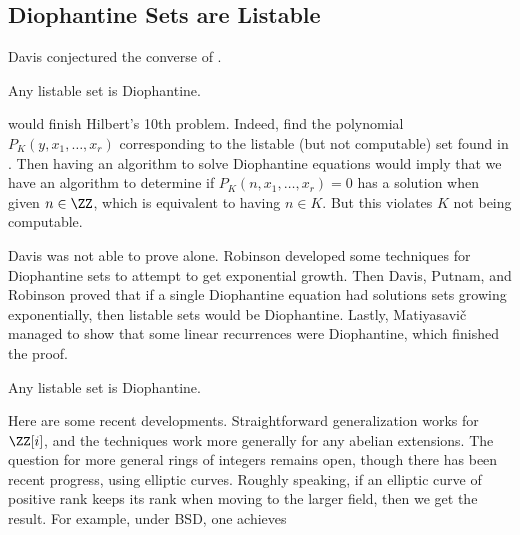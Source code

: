 \documentclass{article}
\begin{document}
\subsection{Diophantine Sets are Listable}
Davis conjectured the converse of .
\begin{conj}[Davis] \label{conj:davis}
	Any listable set is Diophantine.
\end{conj}
 would finish Hilbert's 10th problem. Indeed, find the polynomial $P_K(y,x_1,\ldots,x_r)$ corresponding to the listable (but not computable) set found in . Then having an algorithm to solve Diophantine equations would imply that we have an algorithm to determine if $P_K(n,x_1,\ldots,x_r)=0$ has a solution when given $n\in\ZZ$, which is equivalent to having $n\in K$. But this violates $K$ not being computable.

Davis was not able to prove  alone. Robinson developed some techniques for Diophantine sets to attempt to get exponential growth. Then Davis, Putnam, and Robinson proved that if a single Diophantine equation had solutions sets growing exponentially, then listable sets would be Diophantine. Lastly, Matiyasavi\v{c} managed to show that some linear recurrences were Diophantine, which finished the proof.
\begin{theorem}
	Any listable set is Diophantine.
\end{theorem}
\begin{remark}
	Here are some recent developments. Straightforward generalization works for $\ZZ[i]$, and the techniques work more generally for any abelian extensions. The question for more general rings of integers remains open, though there has been recent progress, using elliptic curves. Roughly speaking, if an elliptic curve of positive rank keeps its rank when moving to the larger field, then we get the result. For example, under BSD, one achieves
\end{remark}
\end{document}
